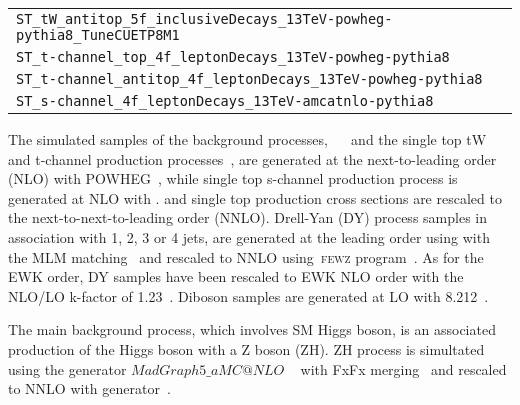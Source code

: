 \begin{table}[htbp]
\begin{center}
\begin{tabular}{|c|}
      \multicolumn{5}{|l|}{\texttt{ST\_tW\_antitop\_5f\_inclusiveDecays\_13TeV-powheg-pythia8\_TuneCUETP8M1}} \\
      \multicolumn{5}{|l|}{\texttt{ST\_t-channel\_top\_4f\_leptonDecays\_13TeV-powheg-pythia8}} \\
      \multicolumn{5}{|l|}{\texttt{ST\_t-channel\_antitop\_4f\_leptonDecays\_13TeV-powheg-pythia8}} \\
      \multicolumn{5}{|l|}{\texttt{ST\_s-channel\_4f\_leptonDecays\_13TeV-amcatnlo-pythia8}} \\
\hline%

    \end{tabular}
  \end{center}
\end{table}



The simulated samples of the background processes,
~\ttbar~\cite{Frixione:2007nw} and the single top tW and t-channel
production processes~\cite{Frederix:2012dh}, are generated at the
next-to-leading order (NLO) with POWHEG~\cite{Alioli:2009je}, while
single top s-channel production process is generated at NLO with
\MADGRAPH. \ttbar and single top production cross sections are
rescaled to the next-to-next-to-leading order (NNLO). Drell-Yan (DY)
process samples in association with 1, 2, 3 or 4 jets, are generated
at the leading order using \MADGRAPH with the MLM
matching~\cite{Alwall:2007fs} and rescaled to NNLO using~\textsc{fewz}
program~\cite{Gavin:2010az,Li:2012wna,Gavin:2012sy}. 
As for the EWK order, DY samples have been rescaled to EWK NLO order with the NLO/LO k-factor of 1.23~\cite{DYkfactor}. Diboson samples
are generated at LO with {\PYTHIA}8.212~\cite{Sjostrand:2007gs}.

The main background
       process, which involves SM Higgs boson, is an associated
       production of the Higgs boson with a Z boson (ZH).  ZH process
       is simultated using the generator
$MadGraph5\_aMC@NLO$
~\cite{cite_aMC@NLO} with FxFx
merging~\cite{Frederix:2012ps} and
rescaled to NNLO with
{\MCFM} generator~\cite{Campbell:2010ff}.


